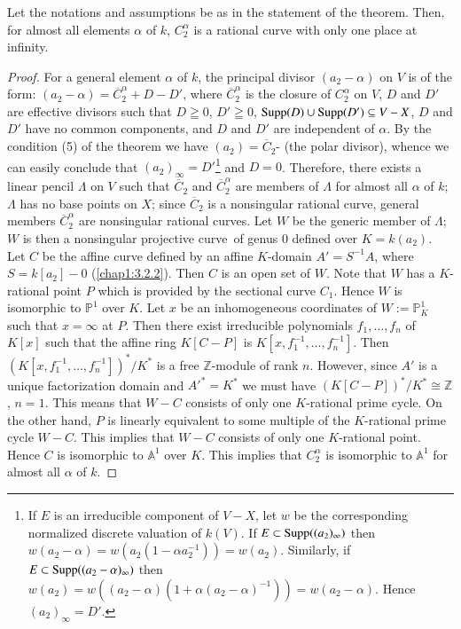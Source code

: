 \subsubsection{}\label{chap1:3.2.3}
\begin{lemma*}
  Let the notations and assumptions be as in the statement of the
  theorem. Then, for almost all elements $\alpha$ of $k$,
  $C^{\alpha}_{2}$ is a rational curve with only one place at infinity.
\end{lemma*}

\begin{proof}
For a general element $\alpha$ of $k$, the principal divisor
$(a_{2}-\alpha)$ on $V$ is of the form:
$(a_{2}-\alpha)=\overline{C}^{\alpha}_{2}+D-D'$, where
$\overline{C}^{\alpha}_{2}$ is the closure of $C^{\alpha}_{2}$ on $V$,
$D$ and $D'$ are effective divisors such that $D\geqq 0$, $D'\geqq 0$,
$\operatorname{Supp}(D)\cup \operatorname{Supp} (D')\subseteq V-X$, $D$ and $D'$ have no common
components, and $D$ and $D'$ are independent of $\alpha$. By the
condition (5) of the theorem we have $(a_{2})=\overline{C}_{2}$- (the
polar divisor), whence we can easily conclude that
$(a_{2})_{\infty}=D'$\footnote{If $E$ is an irreducible component of
  $V-X$, let $w$ be the corresponding normalized discrete valuation of
$k(V)$. If $E\subset \operatorname{Supp} ((a_{2})_{\infty})$ then
  $w(a_{2}-\alpha)=w(a_{2}(1-\alpha a^{-1}_{2}))=w(a_{2})$. Similarly,
  if $E\subset \operatorname{Supp} ((a_{2}-\alpha)_{\infty})$ then
  $w(a_{2})=w((a_{2}-\alpha)(1+\alpha(a_{2}-\alpha)^{-1}))=w(a_{2}-\alpha)$. Hence
$(a_{2})_{\infty}=D'$.} and $D=0$. Therefore, there exists a linear
pencil $\Lambda$ on $V$ such that $\overline{C}_{2}$ and
$\overline{C}^{\alpha}_{2}$ are members of $\Lambda$ for almost all
$\alpha$ of $k$; $\Lambda$ has no base points on $X$; since
$\overline{C}_{2}$ is a nonsingular rational curve, general members
$\overline{C}^{\alpha}_{2}$ are nonsingular rational curves. Let $W$
be the generic member of $\Lambda$; $W$ is then a nonsingular
projective  curve\pageoriginale\ of genus $0$ defined over
$K=k(a_{2})$. Let $C$ be the affine curve defined by an affine
$K$-domain $A'=S^{-1}A$, where $S=k[a_{2}]-0$ (\cf \ref{chap1:3.2.2}). Then
$C$ is an open set of $W$. Note that $W$ has a $K$-rational point $P$
which is provided by the sectional curve $C_{1}$. Hence $W$ is
isomorphic to $\mathbb{P}^{1}$ over $K$. Let $x$ be an inhomogeneous
coordinates of $W:=\mathbb{P}^{1}_{K}$ such that $x=\infty$ at
$P$. Then there exist irreducible polynomials $f_{1},\ldots,f_{n}$ of
$K[x]$ such that the affine ring $K[C-P]$ is
$K[x,f^{-1}_{1},\ldots,f^{-1}_{n}]$. Then
$(K[x,f^{-1}_{1},\ldots,f^{-1}_{n}])^{\ast}/K^{\ast}$ is a free
$\mathbb{Z}$-module of rank $n$. However, since $A'$ is a unique
factorization domain and ${A'}^{\ast}=K^{\ast}$ we must have
$(K[C-P])^{\ast}/K^{\ast}\cong \mathbb{Z}$, \iec $n=1$. This means
that $W-C$ consists of only one $K$-rational prime cycle. On the other
hand, $P$ is linearly equivalent to some multiple of the $K$-rational
prime cycle $W-C$. This implies that $W-C$ consists of only one
$K$-rational point. Hence $C$ is isomorphic to $\mathbb{A}^{1}$ over
$K$. This implies that $C^{\alpha}_{2}$ is isomorphic to
$\mathbb{A}^{1}$ for almost all $\alpha$ of $k$.
\end{proof}

